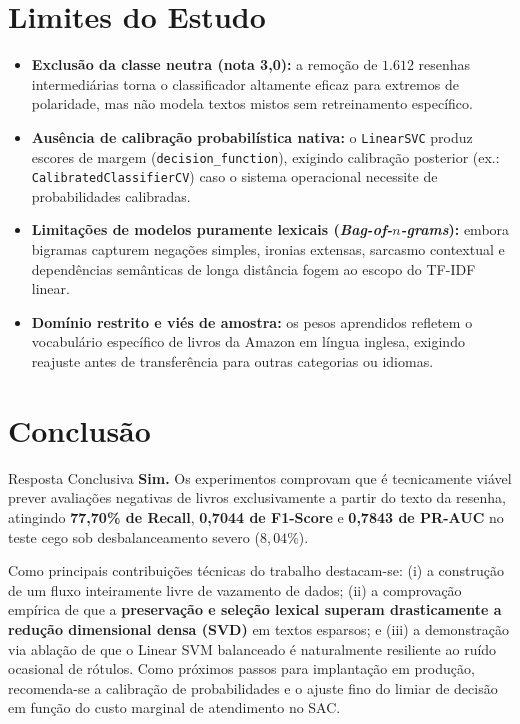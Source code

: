 \documentclass[10pt,a4paper]{article}
\begin{document}
\section{Limites do Estudo}

\begin{itemize}
    \item \textbf{Exclusão da classe neutra (nota 3,0):} a remoção de $1.612$ resenhas intermediárias torna o classificador altamente eficaz para extremos de polaridade, mas não modela textos mistos sem retreinamento específico.
    \item \textbf{Ausência de calibração probabilística nativa:} o \texttt{LinearSVC} produz escores de margem (\texttt{decision\_function}), exigindo calibração posterior (ex.: \texttt{CalibratedClassifierCV}) caso o sistema operacional necessite de probabilidades calibradas.
    \item \textbf{Limitações de modelos puramente lexicais (\textit{Bag-of-$n$-grams}):} embora bigramas capturem negações simples, ironias extensas, sarcasmo contextual e dependências semânticas de longa distância fogem ao escopo do TF-IDF linear.
    \item \textbf{Domínio restrito e viés de amostra:} os pesos aprendidos refletem o vocabulário específico de livros da Amazon em língua inglesa, exigindo reajuste antes de transferência para outras categorias ou idiomas.
\end{itemize}

\section{Conclusão}

\begin{execbox}{Resposta Conclusiva}
\small \textbf{Sim.} Os experimentos comprovam que é tecnicamente viável prever avaliações negativas de livros exclusivamente a partir do texto da resenha, atingindo \textbf{77,70\% de Recall}, \textbf{0,7044 de F1-Score} e \textbf{0,7843 de PR-AUC} no teste cego sob desbalanceamento severo ($8{,}04\%$).
\end{execbox}

\vspace{4pt}
Como principais contribuições técnicas do trabalho destacam-se: (i) a construção de um fluxo inteiramente livre de vazamento de dados; (ii) a comprovação empírica de que a \textbf{preservação e seleção lexical superam drasticamente a redução dimensional densa (SVD)} em textos esparsos; e (iii) a demonstração via ablação de que o Linear SVM balanceado é naturalmente resiliente ao ruído ocasional de rótulos. Como próximos passos para implantação em produção, recomenda-se a calibração de probabilidades e o ajuste fino do limiar de decisão em função do custo marginal de atendimento no SAC.
\end{document}
